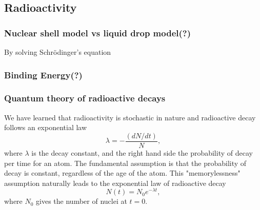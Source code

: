 \documentclass[preprint,aip,pra]{revtex4-1}
\begin{document}
    \subsection{Radioactivity}
    \subsubsection{Nuclear shell model vs liquid drop model(?)}
        By solving Schr\"{o}dinger's equation\cite{k88}
    \subsubsection{Binding Energy(?)}

        \subsubsection{Quantum theory of radioactive decays}
        We have learned that radioactivity is stochastic in nature and radioactive decay follows
        an exponential law
        \begin{equation} \label{eq:exp}
            \lambda = -\frac{(dN/dt)}{N},
        \end{equation}
        where $\lambda$ is the decay constant, and the right hand side the probability of decay
        per time for an atom. The fundamental assumption is that the probability of decay is constant,
        regardless of the age of the atom. This "memorylessness" assumption naturally leads to the
        exponential law of radioactive decay
        \begin{equation}
            N(t) = N_0 e^{-\lambda t},
        \end{equation}
        where $N_0$ gives the number of nuclei at $t=0$.
\end{document}
